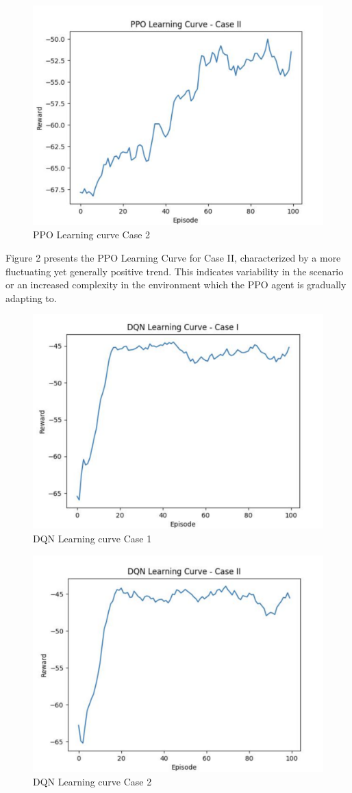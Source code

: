 \documentclass[conference]{IEEEtran}
\begin{document}
\begin{figure} [H]
    \centering
    \includegraphics[width=0.5\linewidth]{Fig 2.png}
    \caption{PPO Learning curve Case 2}
    \label{fig:enter-label}
\end{figure}

Figure 2 presents the PPO Learning Curve for Case II, characterized by a more fluctuating yet generally positive trend. This indicates variability in the scenario or an increased complexity in the environment which the PPO agent is gradually adapting to.

\begin{figure} [H]
    \centering
    \includegraphics[width=0.5\linewidth]{Fig 3.png}
    \caption{DQN Learning curve Case 1}
    \label{fig:enter-label}
\end{figure}

\begin{figure} [H]
    \centering
    \includegraphics[width=0.5\linewidth]{Fig 4.png}
    \caption{DQN Learning curve Case 2}
    \label{fig:enter-label}
\end{figure}
\end{document}
